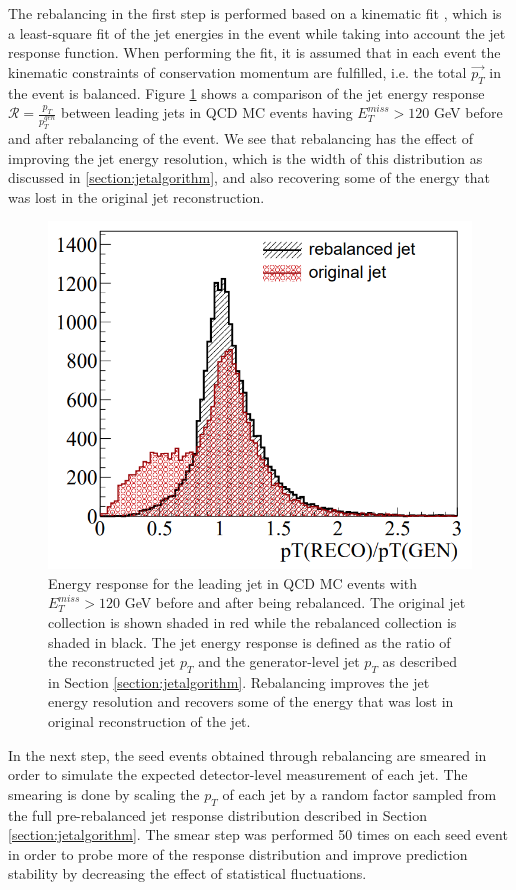 The rebalancing in the first step is performed based on a kinematic fit \cite{DHondt:2006iej}, which is a least-square fit of the jet energies in the event while taking into account the jet response function.  When performing the fit, it is assumed that in each event the kinematic constraints of conservation momentum are fulfilled, i.e. the total $\vec{p_T}$ in the event is balanced.  Figure \ref{fig:rebalancedjetres} shows a comparison of the jet energy response $\mathcal{R} = \frac{p_T}{p_T^{gen}}$ between leading jets in QCD MC events having $E_T^{miss}>120$ GeV before and after rebalancing of the event.  We see that rebalancing has the effect of improving the jet energy resolution, which is the width of this distribution as discussed in \ref{section:jetalgorithm}, and also recovering some of the energy that was lost in the original jet reconstruction.
\begin{figure}[h]
	\centering
	\includegraphics[width=0.7\linewidth]{Figures/RebalancedJetRes}
	\caption[Jet energy response for leading jets in QCD MC before and after rebalancing.]{Energy response for the leading jet in QCD MC events with $E_T^{miss}>120$ GeV before and after being rebalanced. The original jet collection is shown shaded in red while the rebalanced collection is shaded in black. The jet energy response is defined as the ratio of the reconstructed jet $p_T$ and the generator-level jet $p_T$ as described in Section \ref{section:jetalgorithm}.  Rebalancing improves the jet energy resolution and recovers some of the energy that was lost in original reconstruction of the jet.}
	\label{fig:rebalancedjetres}
\end{figure}

In the next step, the seed events obtained through rebalancing are smeared in order to simulate the expected detector-level measurement of each jet.  The smearing is done by scaling the $p_T$ of each jet by a random factor sampled from the full pre-rebalanced jet response distribution described in Section \ref{section:jetalgorithm}.  The smear step was performed 50 times on each seed event in order to probe more of the response distribution and improve prediction stability by decreasing the effect of statistical fluctuations.

